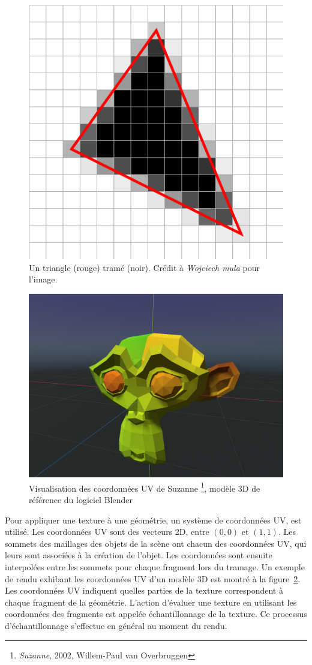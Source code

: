 \begin{figure}[t]
    \centering
    \includegraphics[width=.55\textwidth]{contenu/resources/images/rasterization}
    \caption[Tramage d'un triangle]{Un triangle (rouge) tramé (noir). Crédit à \textit{Wojciech mula} pour l'image.}
    \label{fig:rasterization}
\end{figure}

\bigskip

\begin{figure}
    \centering
    \includegraphics[width=.55\textwidth]{contenu/resources/images/uv_suzanne}
    \caption[Coordonnées UV du modèle Suzanne]{Visualisation des coordonnées UV de Suzanne \footnote{\textit{Suzanne}, 2002, Willem-Paul van Overbruggen}, modèle 3D de référence du logiciel Blender}
    \label{fig:uv-suzanne}
\end{figure}

Pour appliquer une texture à une géométrie, un système de coordonnées UV, est utilisé. Les coordonnées UV sont des vecteurs 2D, entre $(0, 0)$ et $(1, 1)$. Les sommets des maillages des objets de la scène ont chacun des coordonnées UV, qui leurs sont associées à la création de l'objet. Les coordonnées sont ensuite interpolées entre les sommets pour chaque fragment lors du tramage. Un exemple de rendu exhibant les coordonnées UV d'un modèle 3D est montré à la figure~\ref{fig:uv-suzanne}. Les coordonnées UV indiquent quelles parties de la texture correspondent à chaque fragment de la géométrie. L'action d'évaluer une texture en utilisant les coordonnées des fragments est appelée échantillonnage de la texture. Ce processus d'échantillonnage s'effectue en général au moment du rendu.

